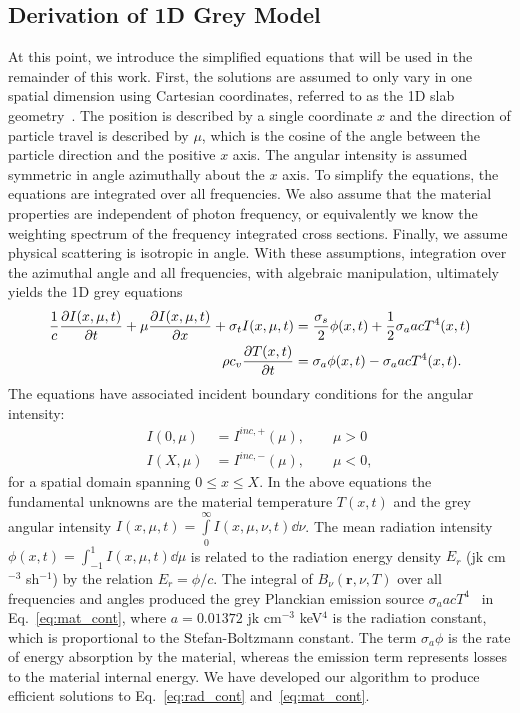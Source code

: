 \subsection{Derivation of 1D Grey Model}

At this point, we introduce the simplified equations that will be used in the remainder of
this work.  First, the solutions are assumed to only vary in one spatial dimension using
Cartesian coordinates, referred to as the 1D slab geometry~\cite{lewis}.   The
position is described by a single coordinate $x$ and the direction of particle travel
is described by $\mu$, which is the cosine of the angle between the particle direction and the
positive $x$ axis. The angular
intensity is assumed symmetric in angle azimuthally about the $x$ axis.  
To
simplify the equations, the equations are integrated over all frequencies.  We also assume that the material properties are independent of photon frequency, or
equivalently we know the weighting spectrum of the frequency integrated cross sections.   Finally, we assume physical scattering
is isotropic in angle. With these assumptions, integration over the azimuthal angle and
all frequencies, with algebraic manipulation, ultimately yields the 1D grey equations~\cite{wollaber_thesis,mihalas}
\begin{align}\label{eq:rad_cont}
    \frac{1}{c}\frac{\partial I(x,\mu,t)}{\partial t} + \mu \frac{\partial I(x,\mu,t)}{\partial x} + \sigma_t
    I(x,\mu,t)
&= \frac{\sigma_s}{2} \phi(x,t) +\frac{1}{2} \sigma_a a c T^4(x,t)
    \\ \label{eq:mat_cont}
  \rho c_v \frac{\partial T(x,t)}{\partial t} &=  \sigma_a \phi(x,t) - \sigma_a a c T^4(x,t).
\end{align}
The equations have associated incident boundary conditions for the angular intensity:
\begin{align}
    I(0,\mu) &= I^{inc,+}(\mu),\quad\quad \mu>0 \\
    I(X,\mu) &= I^{inc,-}(\mu), \quad\quad \mu<0,
\end{align}
for a spatial domain spanning $0\leq x \leq X$.
In the above equations the fundamental unknowns are the material temperature $T(x,t)$ and
the grey angular intensity $I(x,\mu,t)=\int\limits_0^\infty I(x,\mu,\nu,t) \dd \nu$. The mean radiation intensity $\phi(x,t)=\int_{-1}^1
I(x,\mu,t) \dd \mu$ is related to the radiation energy density
$E_r$ (jk cm$^{-3}$ sh$^{-1}$) by the relation $E_r = \phi/c$.  The integral of
$B_\nu(\mathbf{r},\nu,T)$ over all frequencies and angles produced the 
grey Planckian emission source $\sigma_a a c T^4$~\cite{mihalas} in
Eq.~\eqref{eq:mat_cont}, where $a=0.01372$ jk cm$^{-3}$
keV$^{4}$ is the radiation constant, which is proportional to the Stefan-Boltzmann
constant.  The term $\sigma_a \phi$ is the rate of energy absorption by the material,
whereas the emission term represents losses to the material internal energy.  We have developed
our algorithm to produce efficient solutions to Eq.~\eqref{eq:rad_cont}
and~\eqref{eq:mat_cont}.

